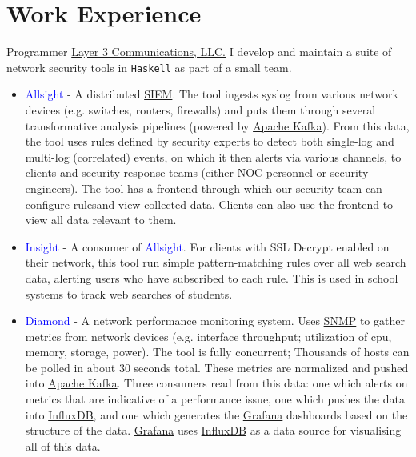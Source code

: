 \documentclass[10pt,letterpaper,sans]{moderncv}
\newcommand{\wlink}[2]{\textcolor[HTML]{461645}{\href{#1}{#2}}}
\newcommand{\lang}[1]{\texttt{#1}}
\begin{document}
\makecvtitle{}


\section{Work Experience}
  {Programmer}
  {\wlink{https://layer3com.com}{Layer 3 Communications, LLC.}}
  {\newline I develop and maintain a suite of network security tools in \lang{Haskell} as part of a small team.
  }
  {}
  {
\begin{itemize}
  \item \textcolor{blue}{Allsight} - A distributed \wlink{https://en.wikipedia.org/wiki/Security_information_and_event_management}{SIEM}. The tool ingests syslog from various network devices (e.g. switches, routers, firewalls) and puts them through several transformative analysis pipelines (powered by \wlink{https://kafka.apache.org/}{Apache Kafka}). From this data, the tool uses rules defined by security experts to detect both single-log and multi-log (correlated) events, on which it then alerts via various channels, to clients and security response teams (either NOC personnel or security engineers). The tool has a frontend through which our security team can configure rulesand view collected data. Clients can also use the frontend to view all data relevant to them.
  \item \textcolor{blue}{Insight} - A consumer of \textcolor{blue}{Allsight}. For clients with SSL Decrypt enabled on their network, this tool run simple pattern-matching rules over all web search data, alerting users who have subscribed to each rule. This is used in school systems to track web searches of students.
  \item \textcolor{blue}{Diamond} - A network performance monitoring system. Uses \wlink{https://en.wikipedia.org/wiki/Simple_Network_Management_Protocol}{SNMP} to gather metrics from network devices (e.g. interface throughput; utilization of cpu, memory, storage, power). The tool is fully concurrent; Thousands of hosts can be polled in about 30 seconds total. These metrics are normalized and pushed into \wlink{https://kafka.apache.org/}{Apache Kafka}. Three consumers read from this data: one which alerts on metrics that are indicative of a performance issue, one which pushes the data into \wlink{https://www.influxdata.com/}{InfluxDB}, and one which generates the \wlink{https://grafana.com/}{Grafana} dashboards based on the structure of the data. \wlink{https://grafana.com/}{Grafana} uses \wlink{https://www.influxdata.com/}{InfluxDB} as a data source for visualising all of this data.

\end{itemize}}
\end{document}
